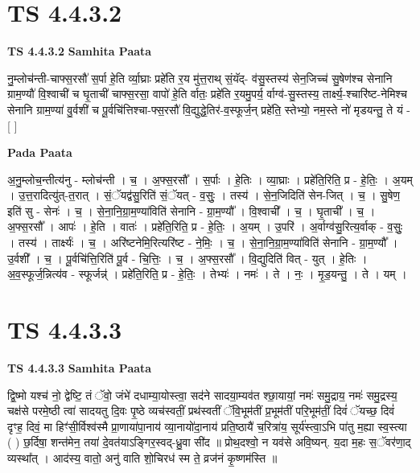 \documentclass[17pt]{extarticle}
\begin{document}

\section{ TS 4.4.3.2 }

\textbf{TS 4.4.3.2 } \newline
\textbf{Samhita Paata} \newline

नु॒म्लोच॑न्ती-चाफ्स॒रसौ॑ स॒र्पा हे॒ति र्व्या॒घ्राः प्रहे॑ति र॒य मु॑त्त॒राथ् सं॒यॅद्- व॑सु॒स्तस्य॑ सेन॒जिच्च॑ सु॒षेण॑श्च सेनानि ग्राम॒ण्यौ॑ वि॒श्वाची॑ च घृ॒ताची॑ चाफ्स॒रसा॒ वापो॑ हे॒ति र्वातः॒ प्रहे॑ति र॒यमु॒पर्य॒ र्वाग्व॑-सु॒स्तस्य॒ तार्क्ष्य॒-श्चारि॑ष्ट-नेमिश्च सेनानि ग्राम॒ण्या॑ वु॒र्वशी॑ च पू॒र्वचि॑त्तिश्चा-फ्स॒रसौ॑ वि॒द्युद्धे॒तिर॑-व॒स्फूर्ज॒न् प्रहे॑ति॒ स्तेभ्यो॒ नम॒स्ते नो॑ मृडयन्तु॒ ते यं - [  ] \newline

\textbf{Pada Paata} \newline

अ॒नु॒म्लोच॒न्तीत्य॑नु - म्लोच॑न्ती । च॒ । अ॒फ्स॒रसौ᳚ । स॒र्पाः । हे॒तिः । व्या॒घ्राः । प्रहे॑ति॒रिति॒ प्र - हे॒तिः॒ । अ॒यम् । उ॒त्त॒रादित्यु॑त्-त॒रात् । सं॒ॅयद्व॑सु॒रिति॑ सं॒ॅयत् - व॒सुः॒ । तस्य॑ । से॒न॒जिदिति॑ सेन-जित् । च॒ । सु॒षेण॒ इति॑ सु - सेनः॑ । च॒ । से॒ना॒नि॒ग्रा॒म॒ण्या॑विति॑ सेनानि - ग्रा॒म॒ण्यौ᳚ । वि॒श्वाची᳚ । च॒ । घृ॒ताची᳚ । च॒ । अ॒फ्स॒रसौ᳚ । आपः॑ । हे॒ति । वातः॑ । प्रहे॑ति॒रिति॒ प्र - हे॒तिः॒ । अ॒यम् । उ॒परि॑ । अ॒र्वाग्व॑सु॒रित्य॒र्वाक् - व॒सुः॒ । तस्य॑ । तार्क्ष्यः॑ । च॒ । अरि॑ष्टनेमि॒रित्यरि॑ष्ट - ने॒मिः॒ । च॒ । से॒ना॒नि॒ग्रा॒म॒ण्या॑विति॑ सेनानि - ग्रा॒म॒ण्यौ᳚ । उ॒र्वशी᳚ । च॒ । पू॒र्वचि॑त्ति॒रिति॑ पू॒र्व - चि॒त्तिः॒ । च॒ । अ॒फ्स॒रसौ᳚ । वि॒द्युदिति॑ वित् - युत् । हे॒तिः । अ॒व॒स्फूर्ज॒न्नित्य॑व - स्फूर्जन्न्॑ । प्रहे॑ति॒रिति॒ प्र - हे॒तिः॒ । तेभ्यः॑ । नमः॑ । ते । नः॒ । मृ॒ड॒यन्तु॒ । ते । यम् ।  \newline





\section{ TS 4.4.3.3 }

\textbf{TS 4.4.3.3 } \newline
\textbf{Samhita Paata} \newline

द्वि॒ष्मो यश्च॑ नो॒ द्वेष्टि॒ तं ॅवो॒ जंभे॑ दधाम्या॒योस्त्वा॒ सद॑ने सादया॒म्यव॑त श्छा॒यायां॒ नमः॑ समु॒द्राय॒ नमः॑ समु॒द्रस्य॒ चक्ष॑से परमे॒ष्ठी त्वा॑ सादयतु दि॒वः पृ॒ष्ठे व्यच॑स्वतीं॒ प्रथ॑स्वतीं ॅवि॒भूम॑तीं प्र॒भूम॑तीं परि॒भूम॑तीं॒ दिवं॑ ॅयच्छ॒ दिवं॑ दृꣳह॒ दिवं॒ मा हिꣳ॑सी॒र्विश्व॑स्मै प्रा॒णाया॑पा॒नाय॑ व्या॒नायो॑दा॒नाय॑ प्रति॒ष्ठायै॑ च॒रित्रा॑य॒ सूर्य॑स्त्वा॒ऽभि पा॑तु म॒ह्या स्व॒स्त्या ( ) छ॒र्दिषा॒ शन्त॑मेन॒ तया॑ दे॒वत॑याऽङ्गिर॒स्वद्-ध्रु॒वा सी॑द ॥ प्रोथ॒दश्वो॒ न यव॑से अवि॒ष्यन्. य॒दा म॒हः स॒ॅवर॑णा॒द् व्यस्था᳚त् । आद॑स्य॒ वातो॒ अनु॑ वाति शो॒चिरध॑ स्म ते॒ व्रज॑नं कृ॒ष्णम॑स्ति ॥ \newline
\end{document}
